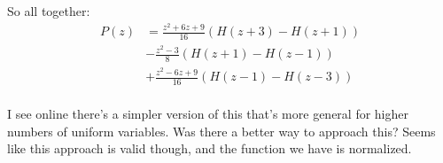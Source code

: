 So all together:
\begin{align*}
    P(z) &= \frac{z^2+6z+9}{16}(H(z+3) - H(z+1)) \\
    &- \frac{z^{2}-3}{8} (H(z+1) - H(z-1)) \\
    &+ \frac{z^2 -6z + 9}{16} (H(z-1) - H(z-3)) \\
\end{align*}

I see online there's a simpler version of this that's more general for higher numbers of uniform variables. Was there a better way to approach this? Seems like this approach is valid though, and the function we have is normalized.
